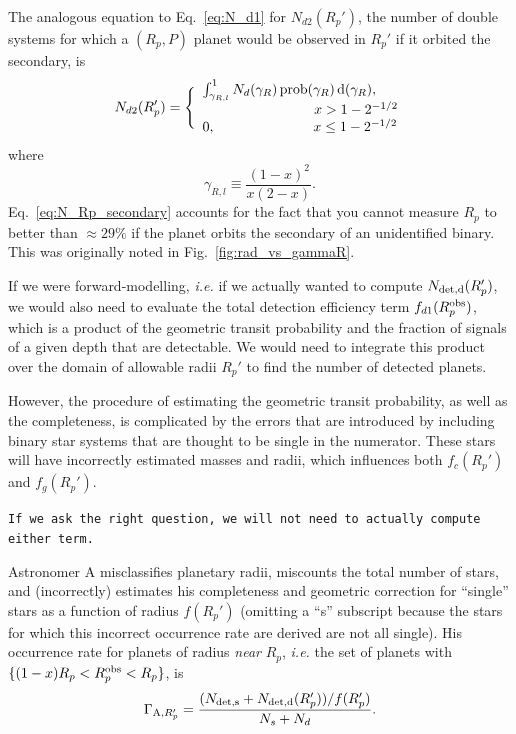 \documentclass{emulateapj}
\begin{document}
The analogous equation to Eq.~\ref{eq:N_d1} for $N_{d2}(R_p')$, the number of 
double systems for which a $(R_p, P)$ planet would be observed in $R_p'$ if it 
orbited the secondary, is
\begin{equation}
N_{d2}(R_p') = 
  \Bigg\{\begin{array}{lr}
  \int_{\gamma_{R,l}}^{1} N_d(\gamma_R)
  \,{\rm prob}(\gamma_R) \,{\rm d}(\gamma_R),\\ 
  \quad\quad\quad\quad\quad\quad\quad\quad x > 1 - 
  2^{-1/2}\\
  0, \quad\quad\quad\quad\quad\quad\quad x \leq 1 - 2^{-1/2} %
  \end{array}
\label{eq:N_Rp_secondary}
\end{equation}
where
\begin{equation}
\gamma_{R,l} \equiv \frac{(1-x)^2}{x (2-x)}.
\end{equation}
Eq.~\ref{eq:N_Rp_secondary} accounts for the fact that you cannot measure 
$R_p$ to better than $\approx 29\%$ if the planet orbits the secondary of an 
unidentified binary.
This was originally noted in Fig.~\ref{fig:rad_vs_gammaR}.

If we were forward-modelling, \textit{i.e.} if we actually wanted to compute 
$N_{\rm det,d}(R_p')$, we would also need to evaluate the total detection 
efficiency term $f_{d1}(R_p^{\rm obs})$, which is a product of the geometric 
transit probability and the fraction of signals of a given depth that are 
detectable.
We would need to integrate this product over the domain of allowable radii 
$R_p'$ to find the number of detected planets.

However, the procedure of estimating the geometric transit probability, as well 
as the completeness, is complicated by the errors that are introduced by 
including binary star systems that are thought to be single in the numerator.
These stars will have incorrectly estimated masses and radii, which influences 
both $f_c(R_p')$ and $f_g(R_p')$.

\texttt{If we ask the right question, we will not need to actually compute 
either term.}

Astronomer A misclassifies planetary radii, miscounts the total number of 
stars, and (incorrectly) estimates his completeness and geometric correction 
for ``single'' stars as a function of radius $f(R_p')$ (omitting a ``s'' 
subscript because the stars for which this incorrect occurrence rate are 
derived are not all single).
His occurrence rate for planets of radius \textit{near} $R_p$, \textit{i.e.} 
the set of planets with $\{ (1-x)R_p < R_p^{\rm obs} < R_p \}$, is
\begin{equation}
\Gamma_{{\rm A}, R_p'} = \frac{ (N_{\rm det,s} + N_{\rm det,d}(R_p')) 
/ f(R_p')   }{ N_s + N_d}.
\end{equation}
\end{document}
